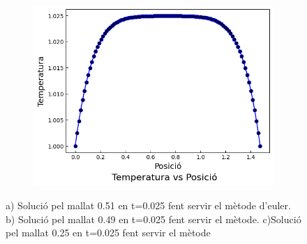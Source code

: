 \documentclass{article}
\begin{document}
\begin{figure}[h]
\begin{subfigure}[b]{0.32\textwidth}
        \includegraphics[width=\textwidth]{images/T_vs_z_at3.png}
        \caption{} 
        \label{fig:euler_exp_at2}
    \end{subfigure}
    \caption{a) Solució pel mallat 0.51 en t=0.025 fent servir el mètode d'euler. b) Solució pel mallat 0.49 en t=0.025 fent servir el mètode. c)Solució pel mallat 0.25 en t=0.025 fent servir el mètode}
    \label{fig:euler_explicit}
\end{figure}
\end{document}
